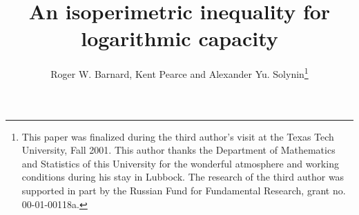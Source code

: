 
\title{ An isoperimetric inequality for logarithmic capacity}

\author{ Roger W. Barnard, Kent Pearce and Alexander Yu. Solynin\thanks{This paper 
was finalized during the third author's
visit at the Texas Tech University, Fall 2001. This author thanks
the Department of Mathematics and Statistics of this University for the
wonderful atmosphere and working conditions during his stay in Lubbock.
The research of the third author was supported in part by the
Russian Fund for Fundamental Research, grant no. 00-01-00118a.}}


\newcommand{\meas}{{\rm meas}\,}
\newcommand{\area}{{\rm area}\,}
\newcommand{\diam}{{\rm diam}\,}
\newcommand{\CAP}{{\rm cap}\,}

\newcommand{\be}{\begin{equation}}
\newcommand{\ee}{\end{equation}}
\newcommand{\bl}{\begin{lemma}}
\newcommand{\el}{\end{lemma}}
\newtheorem{theorem}{Theorem}
\newtheorem{lemma}{Lemma}
\newtheorem{corollary}{Corollary}
\newtheorem{theo}{Theorem}
\newtheorem{conjecture}{Conjecture}
\newtheorem{lemmaA}{Lemma}
\newcommand{\blemmaA}{\begin{lemmaA}}
\newcommand{\elemmaA}{\end{lemmaA}}
\newtheorem{proposition}{Proposition}
\newcommand{\bprop}{\begin{proposition}}
\newcommand{\eprop}{\end{proposition}}

\newtheorem{fig}{Box for Figure}
\renewcommand{\thetheo}{\Alph{theo}}
\renewcommand{\theequation}{\thesection.\arabic{equation}}
\renewcommand{\thelemmaA}{\Alph{lemmaA}}
\newcommand{\bt}{\begin{theorem}}
\newcommand{\et}{\end{theorem}}
\newcommand{\bc}{\begin{corollary}}
\newcommand{\ec}{\end{corollary}}
\newcommand{\bcon}{\begin{conjecture}}
\newcommand{\econ}{\end{conjecture}}
\newcommand{\ep}{\varepsilon}
\newcommand{\e}{\varepsilon}

